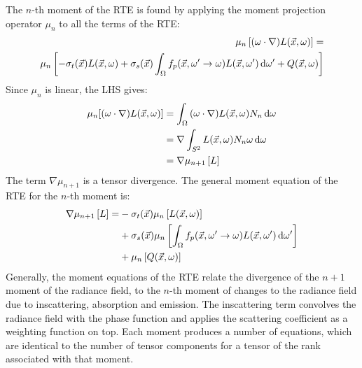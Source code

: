The $n$-th moment of the RTE is found by applying the moment projection operator $\mu_n$ to all the terms of the RTE:
\begin{align*}
\mu_n\left[(\omega\cdot\nabla)L(\vec{x}, \omega)\right]=&\\
\mu_n\left[-\sigma_t(\vec{x})L(\vec{x}, \omega) + \sigma_s(\vec{x})\int_{\Omega}f_p(\vec{x}, \omega'\rightarrow\omega)L(\vec{x}, \omega')\,\mathrm{d}\omega' + Q(\vec{x}, \omega)\right]
\end{align*}
Since $\mu_n$ is linear, the LHS gives:
\begin{align*}
\mu_n[(\omega \cdot \nabla)L(\vec{x}, \omega)] & = \int_{\Omega}{(\omega\cdot\nabla)L(\vec{x}, \omega)N_n\,\mathrm{d}\omega}\\
							     & =\nabla\int_{S^2}{L(\vec{x}, \omega)N_n\omega\,\mathrm{d}\omega} \\
							     & =\nabla\mu_{n+1}\left[L\right]
\end{align*}
The term $\nabla\mu_{n+1}$ is a tensor divergence. The general moment equation of the RTE for the $n$-th moment is:
\begin{align}
\nonumber
\nabla\mu_{n+1}\left[L\right] =&
-\sigma_t(\vec{x})\mu_n\left[L(\vec{x}, \omega)\right]\\
\label{eq:gme}
&+\sigma_s(\vec{x})\mu_n\left[\int_{\Omega}f_p(\vec{x}, \omega'\rightarrow\omega) L(\vec{x}, \omega')\,\mathrm{d}\omega'\right]\\
\nonumber
&+\mu_n\left[Q(\vec{x}, \omega)\right]
\end{align}
Generally, the moment equations of the RTE relate the divergence of the $n+1$ moment of the radiance field, to the $n$-th moment of changes to the radiance field due to inscattering, absorption and emission. The inscattering term convolves the radiance field with the phase function and applies the scattering coefficient as a weighting function on top. Each moment produces a number of equations, which are identical to the number of tensor components for a tensor of the rank associated with that moment.

